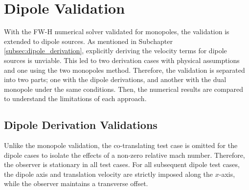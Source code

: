 \section{Dipole Validation} \label{subsec:dipole_validation}

With the FW-H numerical solver validated for monopoles, the validation is extended to dipole sources. As mentioned in Subchapter \ref{subsec:dipole_derivation}, explicitly deriving the velocity terms for dipole sources is unviable. This led to two derivation cases with physical assumptions and one using the two monopoles method. Therefore, the validation is separated into two parts; one with the dipole derivations, and another with the dual monopole under the same conditions. Then, the numerical results are compared to understand the limitations of each approach.

\subsection{Dipole Derivation Validations} \label{subsec:dipole_derivation_validation}

Unlike the monopole validation, the co-translating test case is omitted for the dipole cases to isolate the  effects of a non-zero relative mach number. Therefore, the observer is stationary in all test cases. For all subsequent dipole test cases, the dipole axis and translation velocity are strictly imposed along the $x$-axis, while the observer maintains a transverse offset.

